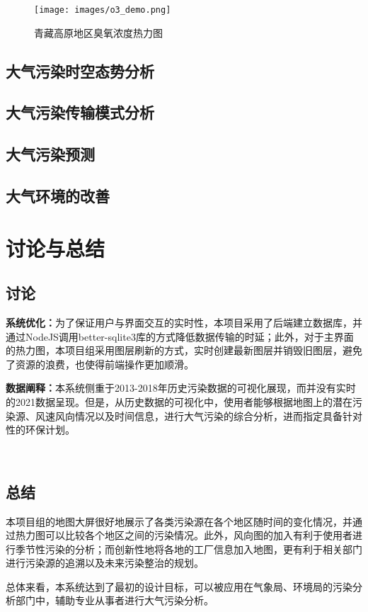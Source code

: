 \documentclass[UTF8]{ctexrep}
\begin{document}
    \begin{figure}[h!]
        \centering
        \texttt{[image: images/o3\_demo.png]}
        \caption{青藏高原地区臭氧浓度热力图}
        \label{fig:o3_tibet}
    \end{figure}

    \subsection{大气污染时空态势分析}

    \subsection{大气污染传输模式分析}

    \subsection{大气污染预测}

    \subsection{大气环境的改善}

    \section{讨论与总结}
    \subsection{讨论}
    \textbf{系统优化：}为了保证用户与界面交互的实时性，本项目采用了后端建立数据库，并通过NodeJS调用better-sqlite3库的方式降低数据传输的时延；此外，对于主界面的热力图，本项目组采用图层刷新的方式，实时创建最新图层并销毁旧图层，避免了资源的浪费，也使得前端操作更加顺滑。
    
    \textbf{数据阐释：}本系统侧重于2013-2018年历史污染数据的可视化展现，而并没有实时的2021数据呈现。但是，从历史数据的可视化中，使用者能够根据地图上的潜在污染源、风速风向情况以及时间信息，进行大气污染的综合分析，进而指定具备针对性的环保计划。
     
    ~\\ 
    \subsection{总结}
    本项目组的地图大屏很好地展示了各类污染源在各个地区随时间的变化情况，并通过热力图可以比较各个地区之间的污染情况。此外，风向图的加入有利于使用者进行季节性污染的分析；而创新性地将各地的工厂信息加入地图，更有利于相关部门进行污染源的追溯以及未来污染整治的规划。
    
    总体来看，本系统达到了最初的设计目标，可以被应用在气象局、环境局的污染分析部门中，辅助专业从事者进行大气污染分析。
\end{document}
